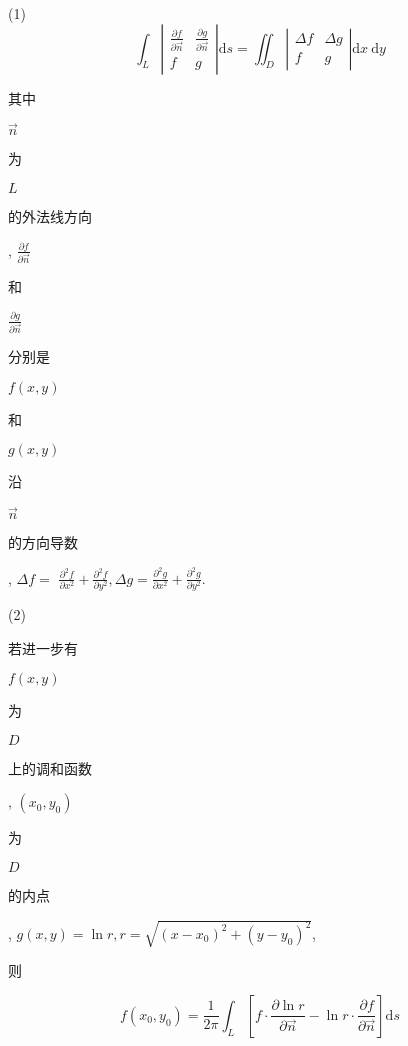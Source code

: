 \documentclass[10pt]{article}
\begin{document}
(1)
$$
\int_{L}\left|\begin{array}{cc}
\frac{\partial f}{\partial \vec{n}} & \frac{\partial g}{\partial \vec{n}} \\
f & g
\end{array}\right| \mathrm{d} s=\iint_{D}\left|\begin{array}{cc}
\Delta f & \Delta g \\
f & g
\end{array}\right| \mathrm{d} x \mathrm{~d} y
$$
\begin{CJK}{UTF8}{mj}其中\end{CJK} $\vec{n}$ \begin{CJK}{UTF8}{mj}为\end{CJK} $L$ \begin{CJK}{UTF8}{mj}的外法线方向\end{CJK}, $\frac{\partial f}{\partial \vec{n}}$ \begin{CJK}{UTF8}{mj}和\end{CJK} $\frac{\partial g}{\partial \vec{n}}$ \begin{CJK}{UTF8}{mj}分别是\end{CJK} $f(x, y)$ \begin{CJK}{UTF8}{mj}和\end{CJK} $g(x, y)$ \begin{CJK}{UTF8}{mj}沿\end{CJK} $\vec{n}$ \begin{CJK}{UTF8}{mj}的方向导数\end{CJK}, $\Delta f=$ $\frac{\partial^{2} f}{\partial x^{2}}+\frac{\partial^{2} f}{\partial y^{2}}, \Delta g=\frac{\partial^{2} g}{\partial x^{2}}+\frac{\partial^{2} g}{\partial y^{2}} .$

(2) \begin{CJK}{UTF8}{mj}若进一步有\end{CJK} $f(x, y)$ \begin{CJK}{UTF8}{mj}为\end{CJK} $D$ \begin{CJK}{UTF8}{mj}上的调和函数\end{CJK}, $\left(x_{0}, y_{0}\right)$ \begin{CJK}{UTF8}{mj}为\end{CJK} $D$ \begin{CJK}{UTF8}{mj}的内点\end{CJK}, $g(x, y)=\ln r, r=\sqrt{\left(x-x_{0}\right)^{2}+\left(y-y_{0}\right)^{2}}$, \begin{CJK}{UTF8}{mj}则\end{CJK}
$$
f\left(x_{0}, y_{0}\right)=\frac{1}{2 \pi} \int_{L}\left[f \cdot \frac{\partial \ln r}{\partial \vec{n}}-\ln r \cdot \frac{\partial f}{\partial \vec{n}}\right] \mathrm{d} s
$$
\end{document}
